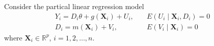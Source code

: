 \documentclass[en,12pt,mtpro2]{elegantpaper}
\begin{document}



Consider the partical linear regression model
\begin{equation}
    \begin{aligned}
        Y_{i}=D_{i}\theta+g(\mathbf{X}_{i})+U_{i}, & \quad E\left(U_{i}\mid\mathbf{X}_{i},D_{i}\right)=0 \\
        D_{i}=m(\mathbf{X}_{i})+V_{i},             & \quad E\left(V_{i}\mid\mathbf{X}_{i}\right)=0
    \end{aligned}
\end{equation}
where $\mathbf{X}_{i}\in\mathbb{R}^{p}$, $i=1,2,\ldots,n$.
\end{document}
